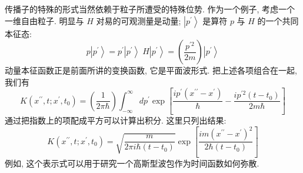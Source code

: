\documentclass[lang=cn,newtx,10pt,scheme=chinese,thmcnt=section]{elegantbook}
\begin{document}
传播子的特殊的形式当然依赖于粒子所遭受的特殊位势. 作为一个例子, 考虑一个一维自由粒子. 明显与 $H$ 对易的可观测量是动量; $\left| {p}^{\prime }\right\rangle$ 是算符 $p$ 与 $H$ 的一个共同本征态:
\begin{equation}
	p\left| {p}^{\prime }\right\rangle = {p}^{\prime }\left| {p}^{\prime }\right\rangle \;H\left| {p}^{\prime }\right\rangle = \left( \frac{{p}^{\prime 2}}{2m}\right) \left| {p}^{\prime }\right\rangle
\end{equation}
动量本征函数正是前面所讲的变换函数, 它是平面波形式. 把上述各项组合在一起, 我们有
\begin{equation}
	K\left( {{x}^{\prime \prime }, t;{x}^{\prime },{t}_{0}}\right) = \left( \frac{1}{{2\pi }\hbar }\right) \int_{-\infty }^{\infty }d{p}^{\prime }\exp \left\lbrack {\frac{i{p}^{\prime }\left( {{x}^{\prime \prime } - {x}^{\prime }}\right) }{\hbar } - \frac{i{p}^{\prime 2}\left( {t - {t}_{0}}\right) }{{2m}\hbar }}\right\rbrack
\end{equation}
通过把指数上的项配成平方可以计算出积分. 这里只列出结果:
\begin{equation}
	K\left( {{x}^{\prime \prime }, t;{x}^{\prime },{t}_{0}}\right) = \sqrt{\frac{m}{{2\pi i}\hbar \left( {t - {t}_{0}}\right) }}\exp \left\lbrack \frac{{im}{\left( {x}^{\prime \prime } - {x}^{\prime }\right) }^{2}}{2\hbar \left( {t - {t}_{0}}\right) }\right\rbrack
\end{equation}
例如, 这个表示式可以用于研究一个高斯型波包作为时间函数如何弥散.
\end{document}
